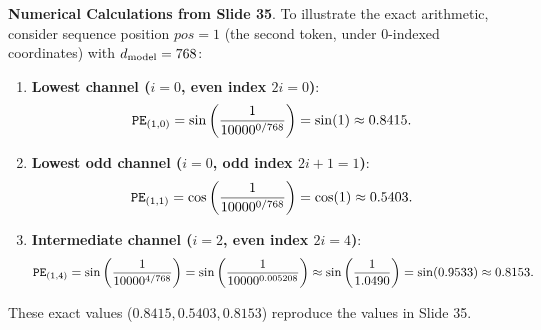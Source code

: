 \documentclass[../../../main.tex]{subfiles}
\begin{document}
\noindent\textbf{Numerical Calculations from Slide 35}.\newline
To illustrate the exact arithmetic, consider sequence position $pos = 1$ (the second token, under 0-indexed coordinates) with $d_{\text{model}} = 768$:
\begin{enumerate}
    \item \textbf{Lowest channel ($i = 0$, even index $2i = 0$)}:
    \begin{equation}
    \text{\texttt{PE}}_{(1, 0)} = \sin\left(\frac{1}{10000^{0 / 768}}\right) = \sin(1) \approx 0.8415.
    \end{equation}
    \item \textbf{Lowest odd channel ($i = 0$, odd index $2i+1 = 1$)}:
    \begin{equation}
    \text{\texttt{PE}}_{(1, 1)} = \cos\left(\frac{1}{10000^{0 / 768}}\right) = \cos(1) \approx 0.5403.
    \end{equation}
    \item \textbf{Intermediate channel ($i = 2$, even index $2i = 4$)}:
    \begin{equation}
    \text{\texttt{PE}}_{(1, 4)} = \sin\left(\frac{1}{10000^{4 / 768}}\right) = \sin\left(\frac{1}{10000^{0.005208}}\right) \approx \sin\left(\frac{1}{1.0490}\right) = \sin(0.9533) \approx 0.8153.
    \end{equation}
\end{enumerate}
These exact values ($0.8415, 0.5403, 0.8153$) reproduce the values in Slide 35.
\end{document}

